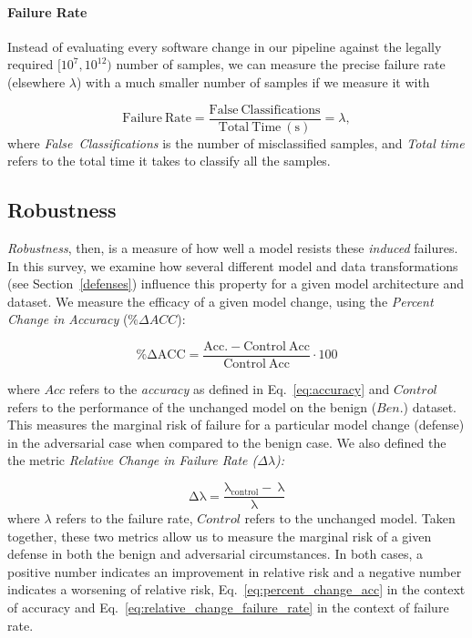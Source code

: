 \documentclass[journal]{IEEEtran}
\begin{document}
\paragraph{Failure Rate}

Instead of evaluating every software change in our pipeline against the legally required $[10^7,10^{12})$ number of samples, we can measure the precise failure rate (elsewhere $\lambda$) with a much smaller number of samples if we measure it with



\begin{equation}\label{eq:failure_rate}
    \mathrm{Failure~Rate} = \frac{\mathrm{False~Classifications}}{\mathrm{Total ~Time~(s)}}
                          = \lambda,
\end{equation}
where \textit{False~Classifications} is the number of misclassified samples, and \textit{Total time} refers to the total time it takes to classify all the samples. 


\subsection{Robustness}
\textit{Robustness}, then, is a measure of how well a model resists these \textit{induced} failures. In this survey, we examine how several different model and data transformations (see Section~\ref{defenses}) influence this property for a given model architecture and dataset. We measure the efficacy of a given model change, using the \textit{Percent Change in Accuracy} ($\%\Delta ACC$):

\begin{equation}
    \label{eq:percent_change_acc}
    \mathrm{\%\Delta ACC = 
        \frac{Acc.-Control~Acc}{Control~Acc}} \cdot 100
\end{equation}

where $Acc$ refers to the \textit{accuracy} as defined in Eq.~\ref{eq:accuracy} and $Control$ refers to the performance of the unchanged model on the benign ($Ben.$) dataset. This measures the marginal risk of failure for a particular model change (defense) in the adversarial case when compared to the benign case. We also defined the the metric \textit{Relative Change in Failure Rate ($ \Delta \lambda$):}

\begin{equation}
\label{eq:relative_change_failure_rate}
\mathrm{\Delta \lambda} = 
    \frac{\mathrm{\lambda_{control}-~\lambda}}{\mathrm{\lambda}}
\end{equation}
where $\lambda$ refers to the failure rate, $Control$ refers to the unchanged model. Taken together, these two metrics allow us to measure the marginal risk of a given defense in both the benign and adversarial circumstances. In both cases, a positive number indicates an improvement in relative risk and a negative number indicates a worsening of relative risk, Eq.~\ref{eq:percent_change_acc} in the context of accuracy and Eq.~\ref{eq:relative_change_failure_rate} in the context of failure rate.
\end{document}
